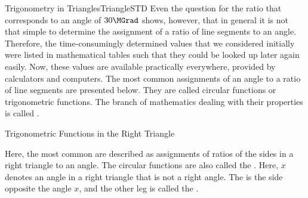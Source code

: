 \begin{MXContent}{Trigonometry in Triangles}{Triangle}{STD}
Even the question for the ratio that corresponds to an angle of $30\MGrad$ shows, however,
that in general it is not that simple to determine the assignment of a ratio
of line segments to an angle.
Therefore, the time-consumingly determined values that we considered initially
were listed in mathematical tables such that they could be looked up later again easily.
Now, these values are available practically everywhere, provided by calculators and 
computers. The most common assignments of an angle to a ratio of line segments are presented 
below. They are called circular functions or trigonometric functions.
The branch of mathematics dealing with their properties is called 
.


\begin{MXInfo}{Trigonometric Functions in the Right Triangle}%
%

Here, the most common 
are described as assignments of ratios of the sides in a right triangle to an angle. 
The circular functions are also called the .
Here, $x$ denotes an angle in a right triangle that is not a right angle.
The  is the side opposite the angle $x$, 
and the other leg is called the . 

\begin{center}
\end{center}


\end{MXInfo}
\end{MXContent}
